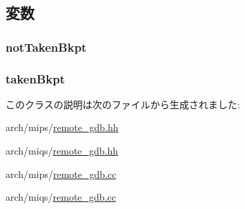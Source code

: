\subsection{変数}
\hypertarget{classMipsISA_1_1RemoteGDB_ae1a0a563a724aaffa8ae5b4095957aa4}{
\subsubsection[{notTakenBkpt}]{ {\bf notTakenBkpt}}}
\label{classMipsISA_1_1RemoteGDB_ae1a0a563a724aaffa8ae5b4095957aa4}
\hypertarget{classMipsISA_1_1RemoteGDB_abfdbe67e311a613bbbe39b730279f3e1}{
\subsubsection[{takenBkpt}]{ {\bf takenBkpt}}}
\label{classMipsISA_1_1RemoteGDB_abfdbe67e311a613bbbe39b730279f3e1}


このクラスの説明は次のファイルから生成されました:\begin{DoxyCompactItemize}
\item 
arch/mips/\hyperlink{arch_2mips_2remote__gdb_8hh}{remote\_\-gdb.hh}\item 
arch/miqs/\hyperlink{arch_2miqs_2remote__gdb_8hh}{remote\_\-gdb.hh}\item 
arch/mips/\hyperlink{arch_2mips_2remote__gdb_8cc}{remote\_\-gdb.cc}\item 
arch/miqs/\hyperlink{arch_2miqs_2remote__gdb_8cc}{remote\_\-gdb.cc}\end{DoxyCompactItemize}
